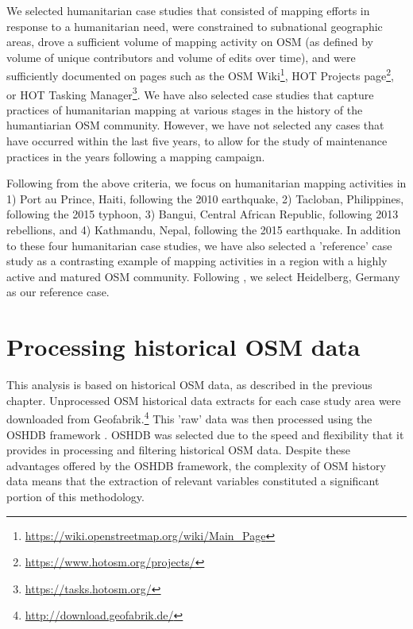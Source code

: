 We selected humanitarian case studies that consisted of mapping efforts in response to a humanitarian need, were constrained to subnational geographic areas, drove a sufficient volume of mapping activity on OSM (as defined by volume of unique contributors and volume of edits over time), and were sufficiently documented on pages such as the OSM Wiki\footnote{\url{https://wiki.openstreetmap.org/wiki/Main_Page}}, HOT Projects page\footnote{\url{https://www.hotosm.org/projects/}}, or HOT Tasking Manager\footnote{\url{https://tasks.hotosm.org/}}. We have also selected case studies that capture practices of humanitarian mapping at various stages in the history of the humantiarian OSM community. However, we have not selected any cases that have occurred within the last five years, to allow for the study of maintenance practices in the years following a mapping campaign.  

Following from the above criteria, we focus on humanitarian mapping activities in 1) Port au Prince, Haiti, following the 2010 earthquake, 2) Tacloban, Philippines, following the 2015 typhoon, 3) Bangui, Central African Republic, following 2013 rebellions, and 4) Kathmandu, Nepal, following the 2015 earthquake. In addition to these four humanitarian case studies, we have also selected a 'reference' case study as a contrasting example of mapping activities in a region with a highly active and matured OSM community. Following \textcite{anderson_crowd_2018}, we select Heidelberg, Germany as our reference case.

\section{Processing historical OSM data}
\label{sec:history}

This analysis is based on historical OSM data, as described in the previous chapter. Unprocessed OSM historical data extracts for each case study area were downloaded from Geofabrik.\footnote{\url{http://download.geofabrik.de/}} This 'raw' data was then processed using the OSHDB framework \parencite{raifer_oshdb_2019}. OSHDB was selected due to the speed and flexibility that it provides in processing and filtering historical OSM data. Despite these advantages offered by the OSHDB framework, the complexity of OSM history data means that the extraction of relevant variables constituted a significant portion of this methodology. 

